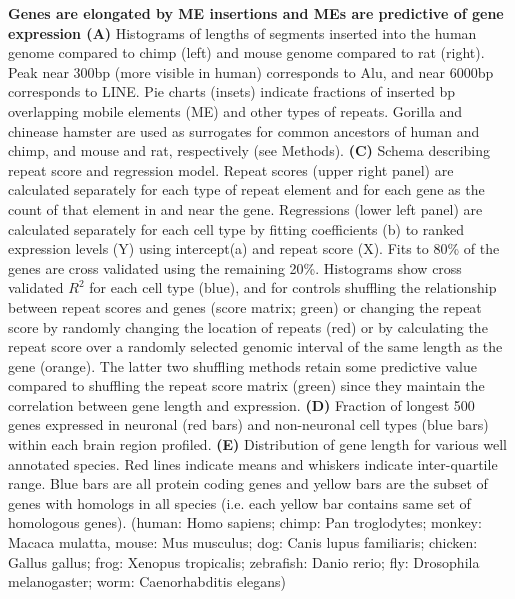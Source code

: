\textbf{Genes are elongated by ME insertions and MEs are predictive of gene expression (A)} Histograms of lengths of segments inserted into the human genome compared to chimp (left) and mouse genome compared to rat (right). Peak near 300bp (more visible in human) corresponds to Alu, and near 6000bp corresponds to LINE. Pie charts (insets) indicate fractions of inserted bp overlapping mobile elements (ME) and other types of repeats. Gorilla and chinease hamster are used as surrogates for common ancestors of human and chimp, and mouse and rat, respectively (see Methods). %
\textbf{(C)} Schema describing repeat score and regression model. Repeat scores (upper right panel) are calculated separately for each type of repeat element and for each gene as the count of that element in and near the gene. Regressions (lower left panel) are calculated separately for each cell type by fitting coefficients (b) to ranked expression levels (Y) using intercept(a) and repeat score (X). Fits to 80\% of the genes are cross validated using the remaining 20\%. Histograms show cross validated $R^2$ for each cell type (blue), and for controls shuffling the relationship between repeat scores and genes (score matrix; green) or changing the repeat score by randomly changing the location of repeats (red) or by calculating the repeat score over a randomly selected genomic interval of the same length as the gene (orange). The latter two shuffling methods retain some predictive value compared to shuffling the repeat score matrix (green) since they maintain the correlation between gene length and expression. \textbf{(D)} Fraction of longest 500 genes expressed in neuronal (red bars) and non-neuronal cell types (blue bars) within each brain region profiled. \textbf{(E)} Distribution of gene length for various well annotated species. Red lines indicate means and whiskers indicate inter-quartile range. Blue bars are all protein coding genes and yellow bars are the subset of genes with homologs in all species (i.e. each yellow bar contains same set of homologous genes). (human: Homo sapiens; chimp: Pan troglodytes; monkey: Macaca mulatta, mouse: Mus musculus; dog: Canis lupus familiaris; chicken: Gallus gallus; frog: Xenopus tropicalis; zebrafish: Danio rerio; fly: Drosophila melanogaster; worm: Caenorhabditis elegans) 